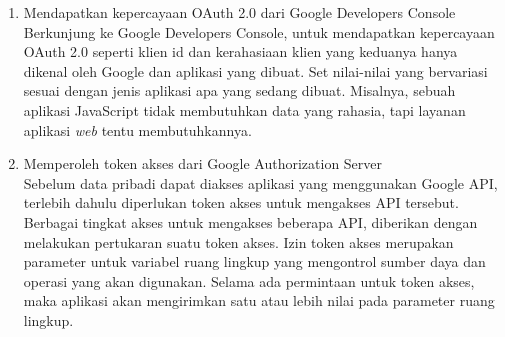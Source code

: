 \begin{enumerate}[(1)]
\item Mendapatkan kepercayaan OAuth 2.0 dari Google Developers Console\\
Berkunjung ke Google Developers Console, untuk mendapatkan kepercayaan OAuth 2.0 seperti klien id dan kerahasiaan klien yang keduanya hanya dikenal oleh Google dan aplikasi yang dibuat. Set nilai-nilai yang bervariasi sesuai dengan jenis aplikasi apa yang sedang dibuat. Misalnya, sebuah aplikasi JavaScript tidak membutuhkan data yang rahasia, tapi layanan aplikasi {\it web} tentu membutuhkannya.
\item Memperoleh token akses dari Google Authorization Server\\
Sebelum data pribadi dapat diakses aplikasi yang menggunakan Google API, terlebih dahulu diperlukan token akses untuk mengakses API tersebut. Berbagai tingkat akses untuk mengakses beberapa API, diberikan dengan melakukan pertukaran suatu token akses. Izin token akses merupakan parameter untuk variabel ruang lingkup yang mengontrol sumber daya dan operasi yang akan digunakan. Selama ada permintaan untuk token akses, maka aplikasi akan mengirimkan satu atau lebih nilai pada parameter ruang lingkup.


\end{enumerate}
